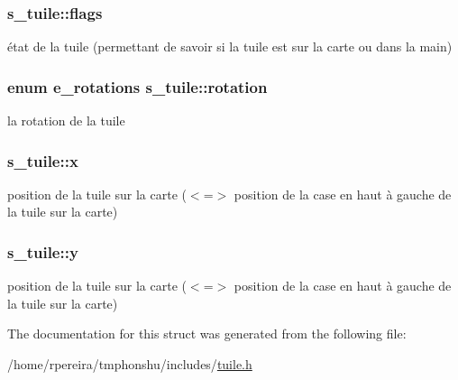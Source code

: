 \subsubsection[{\texorpdfstring{flags}{flags}}]{ s\+\_\+tuile\+::flags}\hypertarget{structs__tuile_a5d69c62cf0466ef19df55fbdb855d72d}{}\label{structs__tuile_a5d69c62cf0466ef19df55fbdb855d72d}
état de la tuile (permettant de savoir si la tuile est sur la carte ou dans la main) 
\subsubsection[{\texorpdfstring{rotation}{rotation}}]{\setlength{\rightskip}{0pt plus 5cm}enum {\bf e\+\_\+rotations} s\+\_\+tuile\+::rotation}\hypertarget{structs__tuile_a750c160d0579f887c8a1cd69b562a5c5}{}\label{structs__tuile_a750c160d0579f887c8a1cd69b562a5c5}
la rotation de la tuile 
\subsubsection[{\texorpdfstring{x}{x}}]{ s\+\_\+tuile\+::x}\hypertarget{structs__tuile_ae907b0e7060b9bba022b58b33865fe99}{}\label{structs__tuile_ae907b0e7060b9bba022b58b33865fe99}
position de la tuile sur la carte ($<$=$>$ position de la case en haut à gauche de la tuile sur la carte) 
\subsubsection[{\texorpdfstring{y}{y}}]{ s\+\_\+tuile\+::y}\hypertarget{structs__tuile_a0f1e6c057219c80008d690c809d75258}{}\label{structs__tuile_a0f1e6c057219c80008d690c809d75258}
position de la tuile sur la carte ($<$=$>$ position de la case en haut à gauche de la tuile sur la carte) 

The documentation for this struct was generated from the following file\+:\begin{DoxyCompactItemize}
\item 
/home/rpereira/tmphonshu/includes/\hyperlink{tuile_8h}{tuile.\+h}\end{DoxyCompactItemize}
